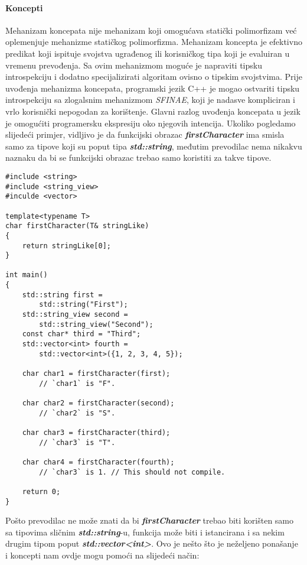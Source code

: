 \paragraph{Koncepti}
Mehanizam koncepata nije mehanizam koji omogućava statički polimorfizam već oplemenjuje mehanizme statičkog polimorfizma. Mehanizam koncepta je efektivno predikat koji ispituje svojstva ugrađenog ili korisničkog tipa koji je evaluiran u vremenu prevođenja. Sa ovim mehanizmom moguće je napraviti tipsku introspekciju i dodatno specijalizirati algoritam ovisno o tipskim svojstvima. Prije uvođenja mehanizma koncepata, programski jezik C++ je mogao ostvariti tipsku introspekciju sa zlogalsnim mehanizmom \textit{SFINAE}, koji je nadasve kompliciran i vrlo korisnički nepogodan za korištenje. Glavni razlog uvođenja koncepata u jezik je omogućiti programersku ekspresiju oko njegovih intencija. Ukoliko pogledamo slijedeći primjer, vidljivo je da funkcijski obrazac \textbf{\textit{firstCharacter}} ima smisla samo za tipove koji su poput tipa \textbf{\textit{std::string}}, međutim prevodilac nema nikakvu naznaku da bi se funkcijski obrazac trebao samo koristiti za takve tipove.
\lstset{language=C++, tabsize=2, frame=single, breaklines=true}
\begin{lstlisting}
#include <string>
#include <string_view>
#inculde <vector>

template<typename T>
char firstCharacter(T& stringLike)
{
    return stringLike[0];
}

int main()
{
    std::string first = 
        std::string("First");
    std::string_view second = 
        std::string_view("Second");
    const char* third = "Third";
    std::vector<int> fourth = 
        std::vector<int>({1, 2, 3, 4, 5});

    char char1 = firstCharacter(first);  
        // `char1` is "F".
    
    char char2 = firstCharacter(second); 
        // `char2` is "S".
    
    char char3 = firstCharacter(third);  
        // `char3` is "T".
    
    char char4 = firstCharacter(fourth); 
        // `char3` is 1. // This should not compile.

    return 0; 
}
\end{lstlisting}
Pošto prevodilac ne može znati da bi \textbf{\textit{firstCharacter}} trebao biti korišten samo sa tipovima sličnim \textbf{\textit{std::string}}-u, funkcija može biti i istancirana i sa nekim drugim tipom poput \textbf{\textit{std::vector<int>}}. Ovo je nešto što je neželjeno ponašanje i koncepti nam ovdje mogu pomoći na slijedeći način:
